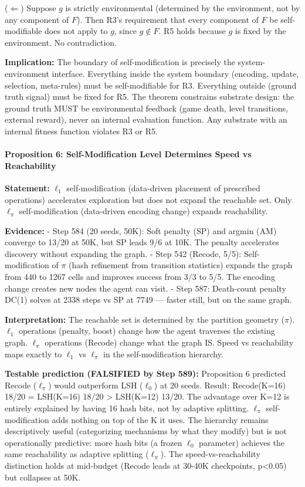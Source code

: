 \documentclass[
  11pt,
]{article}
\begin{document}
(\(\Leftarrow\)) Suppose \(g\) is strictly environmental (determined by
the environment, not by any component of \(F\)). Then R3's requirement
that every component of \(F\) be self-modifiable does not apply to
\(g\), since \(g \notin F\). R5 holds because \(g\) is fixed by the
environment. No contradiction.

\textbf{Implication:} The boundary of self-modification is precisely the
system-environment interface. Everything inside the system boundary
(encoding, update, selection, meta-rules) must be self-modifiable for
R3. Everything outside (ground truth signal) must be fixed for R5. The
theorem constrains substrate design: the ground truth MUST be
environmental feedback (game death, level transitions, external reward),
never an internal evaluation function. Any substrate with an internal
fitness function violates R3 or R5.

\paragraph{Proposition 6: Self-Modification Level Determines Speed vs
Reachability}\label{proposition-6-self-modification-level-determines-speed-vs-reachability}

\textbf{Statement:} \(\ell_1\) self-modification (data-driven placement
of prescribed operations) accelerates exploration but does not expand
the reachable set. Only \(\ell_\pi\) self-modification (data-driven
encoding change) expands reachability.

\textbf{Evidence:} - Step 584 (20 seeds, 50K): Soft penalty (SP) and
argmin (AM) converge to 13/20 at 50K, but SP leads 9/6 at 10K. The
penalty accelerates discovery without expanding the graph. - Step 542
(Recode, 5/5): Self-modification of \(\pi\) (hash refinement from
transition statistics) expands the graph from 440 to 1267 cells and
improves success from 3/3 to 5/5. The encoding change creates new nodes
the agent can visit. - Step 587: Death-count penalty DC(1) solves at
2338 steps vs SP at 7749 --- faster still, but on the same graph.

\textbf{Interpretation:} The reachable set is determined by the
partition geometry (\(\pi\)). \(\ell_1\) operations (penalty, boost)
change how the agent traverses the existing graph. \(\ell_\pi\)
operations (Recode) change what the graph IS. Speed vs reachability maps
exactly to \(\ell_1\) vs \(\ell_\pi\) in the self-modification
hierarchy.

\textbf{Testable prediction (FALSIFIED by Step 589):} Proposition 6
predicted Recode (\(\ell_\pi\)) would outperform LSH (\(\ell_0\)) at 20
seeds. Result: Recode(K=16) 18/20 = LSH(K=16) 18/20 \textgreater{}
LSH(K=12) 13/20. The advantage over K=12 is entirely explained by having
16 hash bits, not by adaptive splitting. \(\ell_\pi\) self-modification
adds nothing on top of the K it uses. The hierarchy remains
descriptively useful (categorizing mechanisms by what they modify) but
is not operationally predictive: more hash bits (a frozen \(\ell_0\)
parameter) achieves the same reachability as adaptive splitting
(\(\ell_\pi\)). The speed-vs-reachability distinction holds at
mid-budget (Recode leads at 30-40K checkpoints, p\textless0.05) but
collapses at 50K.
\end{document}
